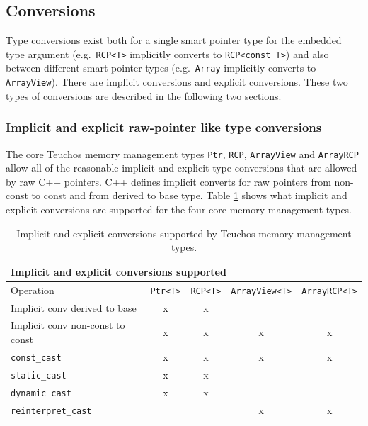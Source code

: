 \documentclass[pdf,ps2pdf,11pt]{SANDreport}
\begin{document}
%
{}\subsection{Conversions}
\label{sec:conversions}
%

Type conversions exist both for a single smart pointer type for the
embedded type argument (e.g.\ {}\texttt{RCP<T>} implicitly converts to
{}\texttt{RCP<const T>}) and also between different smart pointer
types (e.g.\ {}\texttt{Array} implicitly converts to
{}\texttt{ArrayView}).  There are implicit conversions and explicit
conversions.  These two types of conversions are described in the
following two sections.

%
{}\subsubsection{Implicit and explicit raw-pointer like type conversions}
\label{sec:raw-pointer-like-type-conversions}
%

The core Teuchos memory management types {}\texttt{Ptr},
{}\texttt{RCP}, {}\texttt{ArrayView} and {}\texttt{ArrayRCP} allow all
of the reasonable implicit and explicit type conversions that are
allowed by raw C++ pointers.  C++ defines implicit converts for raw
pointers from non-const to const and from derived to base type.  Table
{}\ref{table:implicit_explicit_conversions} shows what implicit and
explicit conversions are supported for the four core memory management
types.

\begin{table}
\begin{center}
\begin{tabular}{|l|c|c|c|c|}
\multicolumn{5}{l}{\textbf{Implicit and explicit conversions supported}} \\
\hline
Operation
& \texttt{Ptr<T>}
& \texttt{RCP<T>}
& \texttt{ArrayView<T>}
& \texttt{ArrayRCP<T>} \\
\hline
\hline
Implicit conv derived to base
& x
& x
& 
&  \\
\hline
Implicit conv non-const to const
& x
& x
& x
& x \\
\hline
{}\texttt{const\_cast}
& x
& x
& x
& x \\
\hline
{}\texttt{static\_cast}
& x
& x
& 
&  \\
\hline
{}\texttt{dynamic\_cast}
& x
& x 
& 
&  \\
\hline
{}\texttt{reinterpret\_cast}
& 
& 
& x
& x \\
\hline
\end{tabular}
\end{center}
\caption{\label{table:implicit_explicit_conversions}
Implicit and explicit conversions supported by Teuchos memory
management types.}
\end{table}
\end{document}
